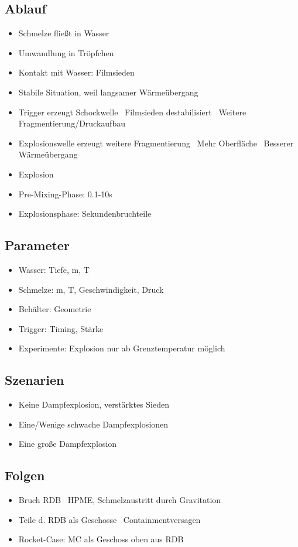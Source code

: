 \documentclass[12pt]{article}
\begin{document}
\subsection{Ablauf}
\begin{itemize}
	\item Schmelze fließt in Wasser
	\item Umwandlung in Tröpfchen
	\item Kontakt mit Wasser: Filmsieden
	\item Stabile Situation, weil langsamer Wärmeübergang
	\item Trigger erzeugt Schockwelle \textrightarrow\ Filmsieden destabilisiert \textrightarrow\ Weitere Fragmentierung/Druckaufbau
	\item Explosionswelle erzeugt weitere Fragmentierung \textrightarrow\ Mehr Oberfläche \textrightarrow\ Besserer Wärmeübergang
	\item Explosion
	\item Pre-Mixing-Phase: 0.1-10s
	\item Explosionsphase: Sekundenbruchteile
\end{itemize}

\subsection{Parameter}
\begin{itemize}
	\item Wasser: Tiefe, m, T
	\item Schmelze: m, T, Geschwindigkeit, Druck
	\item Behälter: Geometrie
	\item Trigger: Timing, Stärke
	\item Experimente: Explosion nur ab Grenztemperatur möglich
\end{itemize}

\subsection{Szenarien}
\begin{itemize}
	\item Keine Dampfexplosion, verstärktes Sieden
	\item Eine/Wenige schwache Dampfexplosionen
	\item Eine große Dampfexplosion
\end{itemize}

\subsection{Folgen}
\begin{itemize}
	\item Bruch RDB \textrightarrow\ HPME, Schmelzaustritt durch Gravitation
	\item Teile d. RDB als Geschosse \textrightarrow\ Containmentversagen
	\item Rocket-Case: MC als Geschoss oben aus RDB
\end{itemize}
\end{document}
